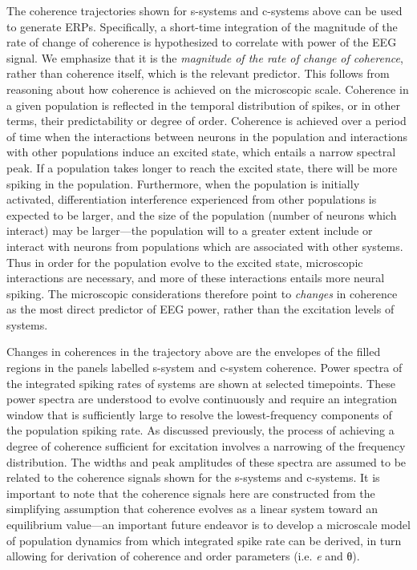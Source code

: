   The coherence trajectories shown for s-systems and c-systems above can be used to generate ERPs. Specifically, a short-time integration of the magnitude of the rate of change of coherence is hypothesized to correlate with power of the EEG signal. We emphasize that it is the \textit{magnitude of the rate of change of coherence}, rather than coherence itself, which is the relevant predictor. This follows from reasoning about how coherence is achieved on the microscopic scale. Coherence in a given population is reflected in the temporal distribution of spikes, or in other terms, their predictability or degree of order. Coherence is achieved over a period of time when the interactions between neurons in the population and interactions with other populations induce an excited state, which entails a narrow spectral peak. If a population takes longer to reach the excited state, there will be more spiking in the population. Furthermore, when the population is initially activated, differentiation interference experienced from other populations is expected to be larger, and the size of the population (number of neurons which interact) may be larger—the population will to a greater extent include or interact with neurons from populations which are associated with other systems. Thus in order for the population evolve to the excited state, microscopic interactions are necessary, and more of these interactions entails more neural spiking. The microscopic considerations therefore point to \textit{changes} in coherence as the most direct predictor of EEG power, rather than the excitation levels of systems. 

Changes in coherences in the trajectory above are the envelopes of the filled regions in the panels labelled s-system and c-system coherence. Power spectra of the integrated spiking rates of systems are shown at selected timepoints. These power spectra are understood to evolve continuously and require an integration window that is sufficiently large to resolve the lowest-frequency components of the population spiking rate. As discussed previously, the process of achieving a degree of coherence sufficient for excitation involves a narrowing of the frequency distribution. The widths and peak amplitudes of these spectra are assumed to be related to the coherence signals shown for the s-systems and c-systems. It is important to note that the coherence signals here are constructed from the simplifying assumption that coherence evolves as a linear system toward an equilibrium value—an important future endeavor is to develop a microscale model of population dynamics from which integrated spike rate can be derived, in turn allowing for derivation of coherence and order parameters (i.e. \textit{e} and θ). 

